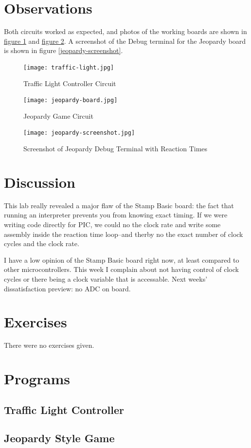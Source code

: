 \documentclass[11pt]{article}
\begin{document}
\section{Observations}

Both circuits worked as expected, and photos of the working boards are shown in
\hyperref[traffic-light]{figure \ref{traffic-light}}
and \hyperref[jeopardy-board]{figure \ref{jeopardy-board}}.
A screenshot of the Debug terminal for the Jeopardy board is shown in figure \ref{jeopardy-screenshot}.

\begin{figure}
\centering
\texttt{[image: traffic-light.jpg]}
\caption{Traffic Light Controller Circuit}
\label{traffic-light}
\end{figure}

\begin{figure}
\centering
\texttt{[image: jeopardy-board.jpg]}
\caption{Jeopardy Game Circuit}
\label{jeopardy-board}
\end{figure}

\begin{figure}
\centering
\texttt{[image: jeopardy-screenshot.jpg]}
\caption{Screenshot of Jeopardy Debug Terminal with Reaction Times}
\label{jeopardy-debug}
\end{figure}

\section{Discussion}

This lab really revealed a major flaw of the Stamp Basic board:
the fact that running an interpreter prevents you from knowing exact timing.
If we were writing code directly for PIC, we could no the clock rate and write some
assembly inside the reaction time loop--and therby no the exact number of clock cycles
and the clock rate.

I have a low opinion of the Stamp Basic board right now, at least compared to other
microcontrollers. This week I complain about not having control of clock cycles or there being
a clock variable that is accessable. Next weeks' dissatisfaction preview: no ADC on board.

\section{Exercises}

There were no exercises given.

\clearpage
\section{Programs}

\subsection{Traffic Light Controller}
\begingroup
\fontsize{10pt}{12pt}



\endgroup

\clearpage
\subsection{Jeopardy Style Game}
\begingroup
\fontsize{9pt}{11pt}



\endgroup
\end{document}
